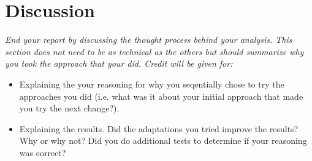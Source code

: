 \documentclass[11pt]{article}
\begin{document}
\section{Discussion} 

{\itshape
End your report by discussing the thought process behind your
analysis. This section does not need to be as technical as the others 
but should summarize why you took the approach that your did. Credit will be given for:

  \begin{itemize}
  \item Explaining the your reasoning for why you seqentially chose to
    try the approaches you did (i.e. what was it about your initial
    approach that made you try the next change?).  
  \item Explaining the results.  Did the adaptations you tried improve
    the results?  Why or why not?  Did you do additional tests to
    determine if your reasoning was correct?  
  \end{itemize}
 }
\end{document}
